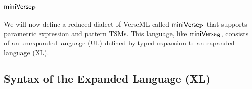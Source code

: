 



\section{\texorpdfstring{$\mathsf{miniVerse}_\textbf{P}$}{miniVerseP}}\label{sec:miniVerseP}
We will now define a reduced dialect of VerseML called $\mathsf{miniVerse}_\textbf{P}$ that supports parametric expression and pattern TSMs. This language, like $\mathsf{miniVerse}_\textbf{S}$, consists of an unexpanded language (UL) defined by typed expansion to an expanded language (XL).

\subsection{Syntax of the Expanded Language (XL)}\label{sec:P-expanded-terms}

